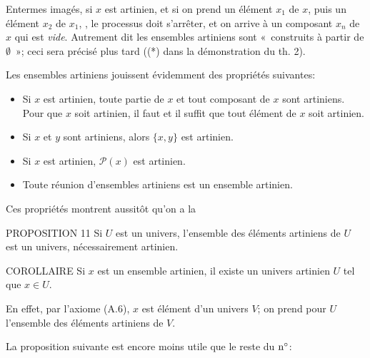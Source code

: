\documentclass[10pt]{../fichiers-configuration-latex/smfart}
\begin{document}
En\pageoriginale termes imagés, si $x$ est artinien, et si on prend
un élément $x_1$ de $x$, puis un élément $x_2$ de $x_1$, \etc, le
processus doit s'arrêter, et on arrive à un composant $x_n$ de $x$
qui est \emph{vide}. Autrement dit les ensembles artiniens sont
« construits à partir de $∅$ »; ceci sera précisé plus
tard (\cf (*) dans la démonstration du th. 2).

Les ensembles artiniens jouissent évidemment des propriétés
suivantes:
\begin{itemize}
\item[(AR.I)] Si $x$ est artinien, toute partie de $x$ et tout
composant de $x$ sont artiniens. Pour que $x$ soit artinien, il faut
et il suffit que tout élément de $x$ soit artinien.

\item[(AR.II)] Si $x$ et $y$ sont artiniens, alors $\{x,y\}$ est
artinien.

\item[(AR.III)] Si $x$ est artinien, $\mathcal{P}(x)$ est artinien.

\item[(AR.IV)] Toute réunion d'ensembles artiniens est un ensemble
artinien.
\end{itemize}

Ces propriétés montrent aussitôt qu'on a la

\begin{enonce*}{PROPOSITION 11}
Si $U$ est un univers, l'ensemble des éléments artiniens de $U$ est
un univers, nécessairement artinien.
\end{enonce*}

\begin{enonce*}{COROLLAIRE}
Si $x$ est un ensemble artinien, il existe un univers artinien $U$
tel que $x\in U$.
\end{enonce*}

En effet, par l'axiome (A.6), $x$ est élément d'un univers $V$; on
prend pour $U$ l'ensemble des éléments artiniens de $V$.

La proposition suivante est encore moins utile que le reste du ${\rm
n^{\circ}}$:
\end{document}
